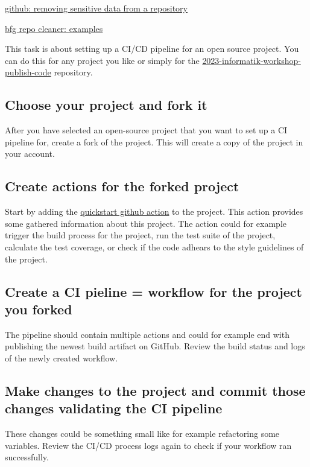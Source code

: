 \documentclass[paper=a4]{scrartcl}
\begin{document}
	\begin{literature} %
  		\item \href{https://docs.github.com/en/authentication/keeping-your-account-and-data-secure/removing-sensitive-data-from-a-repository}{github: removing sensitive data from a repository}
  		\item \href{https://rtyley.github.io/bfg-repo-cleaner/}{bfg repo cleaner: examples}
	\end{literature}

	This task is about setting up a CI/CD pipeline for an open source project. You can do this for any project you like or simply for the \href{https://github.com/marc-philipp-knechtle/2023-informatik-workshop-publish-code}{2023-informatik-workshop-publish-code} repository.
	\subsection*{Choose your project and fork it}
		After you have selected an open-source project that you want to set up a CI pipeline for,
create a fork of the project. This will create a copy of the project in your account.

	\subsection*{Create actions for the forked project}
		Start by adding the \href{https://docs.github.com/en/actions/quickstart}{quickstart github action} to the project. This action provides some gathered information about this project.
		\newline
		The action could for example trigger the build process for the project, run the test suite of the project, calculate the test coverage, or check if the code adhears to the style guidelines of the project. 
	
	\subsection*{Create a CI pieline = workflow for the project you forked} 
		The pipeline should contain multiple actions and could for example end with publishing the newest build artifact on GitHub. Review the build status and logs of the newly created workflow.
	
	\subsection*{Make changes to the project and commit those changes validating the CI pipeline}
		These changes could be something small like for example refactoring some variables. Review the CI/CD process logs again to check if your workflow ran successfully. 
		
\end{document}
